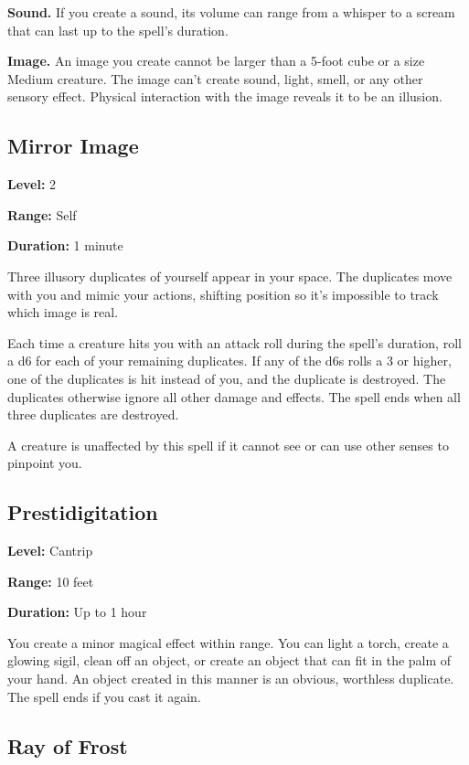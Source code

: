 \documentclass[12pt,letterpaper,twocolumn,openany,nodeprecatedcode,bg=none]{dndbook}
\let\oldsubsection\subsection
\renewcommand{\subsection}[1]{%
  \needspace{5\baselineskip}%
  \oldsubsection{#1}%
}
\begin{document}
\textbf{Sound.} If you create a sound, its volume can range from a
whisper to a scream that can last up to the spell's duration.

\textbf{Image.} An image you create cannot be larger than a 5-foot cube
or a size Medium creature. The image can't create sound, light, smell,
or any other sensory effect. Physical interaction with the image reveals
it to be an illusion.

\subsection{Mirror Image}\label{mirror-image}

\textbf{Level:} 2

\textbf{Range:} Self

\textbf{Duration:} 1 minute

Three illusory duplicates of yourself appear in your space. The
duplicates move with you and mimic your actions, shifting position so
it's impossible to track which image is real.

Each time a creature hits you with an attack roll during the spell's
duration, roll a d6 for each of your remaining duplicates. If any of the
d6s rolls a 3 or higher, one of the duplicates is hit instead of you,
and the duplicate is destroyed. The duplicates otherwise ignore all
other damage and effects. The spell ends when all three duplicates are
destroyed.

A creature is unaffected by this spell if it cannot see or can use other
senses to pinpoint you.

\subsection{Prestidigitation}\label{prestidigitation}

\textbf{Level:} Cantrip

\textbf{Range:} 10 feet

\textbf{Duration:} Up to 1 hour

You create a minor magical effect within range. You can light a torch,
create a glowing sigil, clean off an object, or create an object that
can fit in the palm of your hand. An object created in this manner is an
obvious, worthless duplicate. The spell ends if you cast it again.

\newpage

\subsection{Ray of Frost}\label{ray-of-frost}
\end{document}
